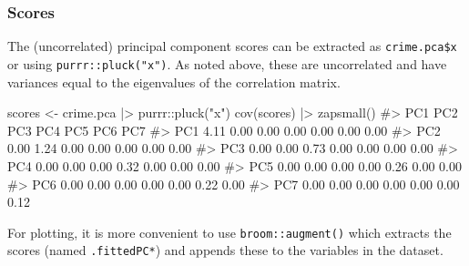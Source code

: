\documentclass[
  letterpaper,
  10pt,
  krantz2]{krantz}
\makeatletter
\newenvironment{Shaded}{\begin{snugshade}}{\end{snugshade}}
\newcommand{\CommentTok}[1]{\textcolor[rgb]{0.37,0.37,0.37}{#1}}
\newcommand{\FunctionTok}[1]{\textcolor[rgb]{0.28,0.35,0.67}{#1}}
\newcommand{\NormalTok}[1]{\textcolor[rgb]{0.00,0.23,0.31}{#1}}
\newcommand{\OtherTok}[1]{\textcolor[rgb]{0.00,0.23,0.31}{#1}}
\newcommand{\SpecialCharTok}[1]{\textcolor[rgb]{0.37,0.37,0.37}{#1}}
\newcommand{\StringTok}[1]{\textcolor[rgb]{0.13,0.47,0.30}{#1}}
\newenvironment{kframe}{%
  \medskip{}
  \setlength{\fboxsep}{.8em}
  \def\at@end@of@kframe{}%
  \ifinner\ifhmode%
  \def\at@end@of@kframe{\end{minipage}}%
  \begin{minipage}{\columnwidth}%
  \fi\fi%
  \def\FrameCommand##1{\hskip\@totalleftmargin \hskip-\fboxsep
  \colorbox{shadecolor}{##1}\hskip-\fboxsep
      \hskip-\linewidth \hskip-\@totalleftmargin \hskip\columnwidth}%
  \MakeFramed {\advance\hsize-\width
    \@totalleftmargin\z@ \linewidth\hsize
    \@setminipage}}%
{\par\unskip\endMakeFramed%
  \at@end@of@kframe}
\renewenvironment{Shaded}{\begin{kframe}}{\end{kframe}}
\makeatother
\begin{document}
\hypertarget{scores}{%
\subsubsection*{Scores}\label{scores}}

The (uncorrelated) principal component scores can be extracted as
\texttt{crime.pca\$x} or using \texttt{purrr::pluck("x")}. As noted
above, these are uncorrelated and have variances equal to the
eigenvalues of the correlation matrix.

\begin{Shaded}
\begin{Highlighting}[]
\NormalTok{scores }\OtherTok{\textless{}{-}}\NormalTok{ crime.pca }\SpecialCharTok{|\textgreater{}}\NormalTok{ purrr}\SpecialCharTok{::}\FunctionTok{pluck}\NormalTok{(}\StringTok{"x"}\NormalTok{) }
\FunctionTok{cov}\NormalTok{(scores) }\SpecialCharTok{|\textgreater{}} \FunctionTok{zapsmall}\NormalTok{()}
\CommentTok{\#\textgreater{}      PC1  PC2  PC3  PC4  PC5  PC6  PC7}
\CommentTok{\#\textgreater{} PC1 4.11 0.00 0.00 0.00 0.00 0.00 0.00}
\CommentTok{\#\textgreater{} PC2 0.00 1.24 0.00 0.00 0.00 0.00 0.00}
\CommentTok{\#\textgreater{} PC3 0.00 0.00 0.73 0.00 0.00 0.00 0.00}
\CommentTok{\#\textgreater{} PC4 0.00 0.00 0.00 0.32 0.00 0.00 0.00}
\CommentTok{\#\textgreater{} PC5 0.00 0.00 0.00 0.00 0.26 0.00 0.00}
\CommentTok{\#\textgreater{} PC6 0.00 0.00 0.00 0.00 0.00 0.22 0.00}
\CommentTok{\#\textgreater{} PC7 0.00 0.00 0.00 0.00 0.00 0.00 0.12}
\end{Highlighting}
\end{Shaded}

For plotting, it is more convenient to use \texttt{broom::augment()}
which extracts the scores (named \texttt{.fittedPC*}) and appends these
to the variables in the dataset.
\end{document}
